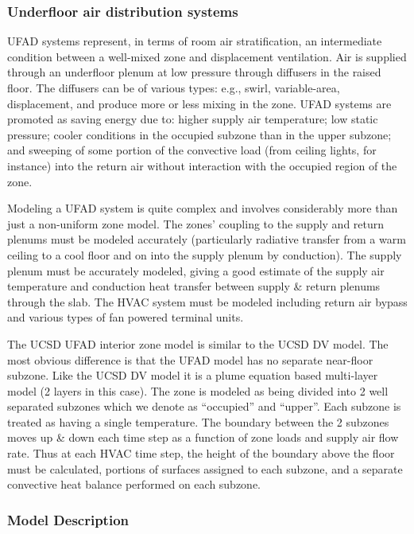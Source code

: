 {\subsubsection{Underfloor air distribution systems}\label{underfloor-air-distribution-systems}

UFAD systems represent, in terms of room air stratification, an intermediate condition between a well-mixed zone and displacement ventilation. Air is supplied through an underfloor plenum at low pressure through diffusers in the raised floor. The diffusers can be of various types: e.g., swirl, variable-area, displacement, and produce more or less mixing in the zone. UFAD systems are promoted as saving energy due to: higher supply air temperature; low static pressure; cooler conditions in the occupied subzone than in the upper subzone; and sweeping of some portion of the convective load (from ceiling lights, for instance) into the return air without interaction with the occupied region of the zone.

Modeling a UFAD system is quite complex and involves considerably more than just a non-uniform zone model. The zones' coupling to the supply and return plenums must be modeled accurately (particularly radiative transfer from a warm ceiling to a cool floor and on into the supply plenum by conduction). The supply plenum must be accurately modeled, giving a good estimate of the supply air temperature and conduction heat transfer between supply \& return plenums through the slab. The HVAC system must be modeled including return air bypass and various types of fan powered terminal units.

The UCSD UFAD interior zone model is similar to the UCSD DV model. The most obvious difference is that the UFAD model has no separate near-floor subzone. Like the UCSD DV model it is a plume equation based multi-layer model (2 layers in this case). The zone is modeled as being divided into 2 well separated subzones which we denote as ``occupied'' and ``upper''. Each subzone is treated as having a single temperature. The boundary between the 2 subzones moves up \& down each time step as a function of zone loads and supply air flow rate. Thus at each HVAC time step, the height of the boundary above the floor must be calculated, portions of surfaces assigned to each subzone, and a separate convective heat balance performed on each subzone.

\subsubsection{Model Description}\label{model-description-1-001}

}
